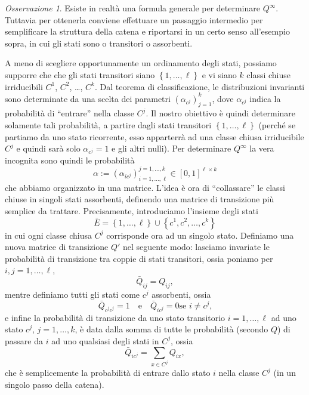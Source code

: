 \documentclass[
  italian,
  letterpaper,
]{book}
\newcommand{\cur}[1]{\left\{ #1 \right\}}
\theoremstyle{definition}
\theoremstyle{remark}
\newtheorem*{remark}{Osservazione}
\begin{document}
\begin{remark}
Esiste in realtà una formula generale per determinare \(Q^\infty\).
Tuttavia per ottenerla conviene effettuare un passaggio intermedio per
semplificare la struttura della catena e riportarsi in un certo senso
all'esempio sopra, in cui gli stati sono o transitori o assorbenti.

A meno di scegliere opportunamente un ordinamento degli stati, possiamo
supporre che che gli stati transitori siano \(\cur{1, \dots, \ell}\) e
vi siano \(k\) classi chiuse irriducibili \(C^1\), \(C^2\), \ldots,
\(C^k\). Dal teorema di classificazione, le distribuzioni invarianti
sono determinate da una scelta dei parametri \((\alpha_{c^j})_{j=1}^k\),
dove \(\alpha_{c^j}\) indica la probabilità di ``entrare'' nella classe
\(C^j\). Il nostro obiettivo è quindi determinare solamente tali
probabilità, a partire dagli stati transitori \(\cur{1, \ldots, \ell}\)
(perché se partiamo da uno stato ricorrente, esso apparterrà ad una
classe chiusa irriducibile \(C^j\) e quindi sarà solo
\(\alpha_{c^j} =1\) e gli altri nulli). Per determinare \(Q^\infty\) la
vera incognita sono quindi le probabilità
\[ \alpha := (\alpha_{ic^j})_{i=1,\ldots, \ell}^{j=1, \ldots, k} \in [0,1]^{\ell \times k}\]
che abbiamo organizzato in una matrice. L'idea è ora di ``collassare''
le classi chiuse in singoli stati assorbenti, definendo una matrice di
transizione più semplice da trattare. Precisamente, introduciamo
l'insieme degli stati
\[ \bar E = \cur{1, \ldots,\ell} \cup\cur{c^1, c^2, \ldots, c^{k} }\] in
cui ogni classe chiusa \(C^j\) corrisponde ora ad un singolo stato.
Definiamo una nuova matrice di transizione \(Q'\) nel seguente modo:
lasciamo invariate le probabilità di transizione tra coppie di stati
transitori, ossia poniamo per \(i,j=1, \ldots, \ell\),
\[\bar Q _{i j} = Q_{ij},\] mentre definiamo tutti gli stati come
\(c^j\) assorbenti, ossia
\[ \bar Q_{c^jc^j} = 1 \quad \text{e} \quad \bar Q_{i c^j} = 0 \text{se $i\neq c^j$,}
\] e infine la probabilità di transizione da uno stato transitorio
\(i =1, \ldots, \ell\) ad uno stato \(c^j\), \(j=1, \ldots, k\), è data
dalla somma di tutte le probabilità (secondo \(Q\)) di passare da \(i\)
ad uno qualsiasi degli stati in \(C^j\), ossia
\[ \bar Q_{i c^j} = \sum_{x \in C^j} Q_{ix},\] che è semplicemente la
probabilità di entrare dallo stato \(i\) nella classe \(C^j\) (in un
singolo passo della catena).


\end{remark}
\end{document}
